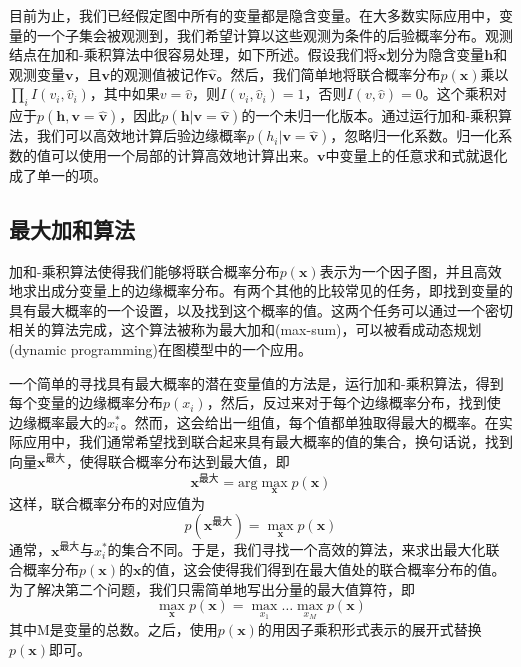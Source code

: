目前为止，我们已经假定图中所有的变量都是隐含变量。在大多数实际应用中，变量的一个子集会被观测到，我们希望计算以这些观测为条件的后验概率分布。观测结点在加和-乘积算法中很容易处理，如下所述。假设我们将$\boldsymbol{x}$划分为隐含变量$\boldsymbol{h}$和观测变量$\boldsymbol{v}$，且$\boldsymbol{v}$的观测值被记作$\hat{\boldsymbol{v}}$。然后，我们简单地将联合概率分布$p(\boldsymbol{x})$乘以$\prod_iI(v_i,\hat{v}_i)$，其中如果$v=\hat{v}$，则$I(v_i,\hat{v}_i)=1$，否则$I(v,\hat{v})=0$。这个乘积对应于$p(\boldsymbol{h},\boldsymbol{v}=\hat{\boldsymbol{v}})$，因此$p(\boldsymbol{h}|\boldsymbol{v}=\hat{\boldsymbol{v}})$的一个未归一化版本。通过运行加和-乘积算法，我们可以高效地计算后验边缘概率$p(h_i|\boldsymbol{v}=\hat{\boldsymbol{v}})$，忽略归一化系数。归一化系数的值可以使用一个局部的计算高效地计算出来。$\boldsymbol{v}$中变量上的任意求和式就退化成了单一的项。
\subsection*{最大加和算法}
加和-乘积算法使得我们能够将联合概率分布$p(\boldsymbol{x})$表示为一个因子图，并且高效地求出成分变量上的边缘概率分布。有两个其他的比较常见的任务，即找到变量的具有最大概率的一个设置，以及找到这个概率的值。这两个任务可以通过一个密切相关的算法完成，这个算法被称为最大加和(max-sum)，可以被看成动态规划(dynamic programming)在图模型中的一个应用。

一个简单的寻找具有最大概率的潜在变量值的方法是，运行加和-乘积算法，得到每个变量的边缘概率分布$p(x_i)$，然后，反过来对于每个边缘概率分布，找到使边缘概率最大的$x_i^*$。然而，这会给出一组值，每个值都单独取得最大的概率。在实际应用中，我们通常希望找到联合起来具有最大概率的值的集合，换句话说，找到向量$\boldsymbol{x}^{\text{最大}}$，使得联合概率分布达到最大值，即
\begin{equation}
	\boldsymbol{x}^{\text{最大}}=\mathrm{arg}\mathop{\mathrm{max}}\limits_{\boldsymbol{x}}p(\boldsymbol{x})
\end{equation}
这样，联合概率分布的对应值为
\begin{equation}
p(\boldsymbol{x}^{\text{最大}})=\mathop{\mathrm{max}}\limits_{\boldsymbol{x}}p(\boldsymbol{x})
\end{equation}
通常，$\boldsymbol{x}^{\text{最大}}$与$x_i^*$的集合不同。于是，我们寻找一个高效的算法，来求出最大化联合概率分布$p(\boldsymbol{x})$的$\boldsymbol{x}$的值，这会使得我们得到在最大值处的联合概率分布的值。为了解决第二个问题，我们只需简单地写出分量的最大值算符，即
\begin{equation}
\label{zhengzha}
	\mathop{\mathrm{max}}\limits_{\boldsymbol{x}}p(\boldsymbol{x})=\mathop{\mathrm{max}}\limits_{x_1}\dots\mathop{\mathrm{max}}\limits_{x_M}p(\boldsymbol{x})
\end{equation}
其中M是变量的总数。之后，使用$p(\boldsymbol{x})$的用因子乘积形式表示的展开式替换$p(\boldsymbol{x})$即可。


